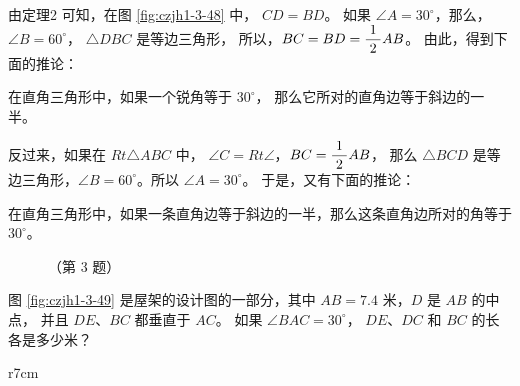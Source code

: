 \begin{enhancedline}
由定理2 可知，在图 \ref{fig:czjh1-3-48} 中， $CD = BD$。
如果 $\angle A = 30^\circ$，那么，$\angle B= 60^\circ$， $\triangle DBC$ 是等边三角形，
所以，$BC = BD = \dfrac{\; 1 \;}{2} AB$。 由此，得到下面的推论：

\begin{tuilun}[推论1]
    在直角三角形中，如果一个锐角等于 $30^\circ$， 那么它所对的直角边等于斜边的一半。
\end{tuilun}

反过来，如果在 $Rt \triangle ABC$ 中， $\angle C = Rt\angle$，$BC = \dfrac{\; 1 \;}{2} AB$，
那么 $\triangle BCD$ 是等边三角形，$\angle B = 60^\circ$。所以 $\angle A = 30^\circ$。
于是，又有下面的推论：

\begin{tuilun}[推论2]
    在直角三角形中，如果一条直角边等于斜边的一半，那么这条直角边所对的角等于 $30^\circ$。
\end{tuilun}


\begin{lianxi}



\begin{figure}[htbp]
    \centering
    \begin{minipage}[b]{7cm}
        \centering
        
        \caption*{（第 2 题）}
    \end{minipage}
    \qquad
    \begin{minipage}[b]{7cm}
        \centering
        
        \caption*{（第 3 题）}
    \end{minipage}
\end{figure}



\end{lianxi}

\liti 图 \ref{fig:czjh1-3-49} 是屋架的设计图的一部分，其中 $AB = 7.4$ 米，$D$ 是 $AB$ 的中点，
并且 $DE$、$BC$ 都垂直于 $AC$。 如果 $\angle BAC = 30^\circ$，
$DE$、$DC$ 和 $BC$ 的长各是多少米？

\begin{wrapfigure}[6]{r}{7cm}
    \centering
    
    \caption{}\label{fig:czjh1-3-49}
\end{wrapfigure}



\end{enhancedline}
